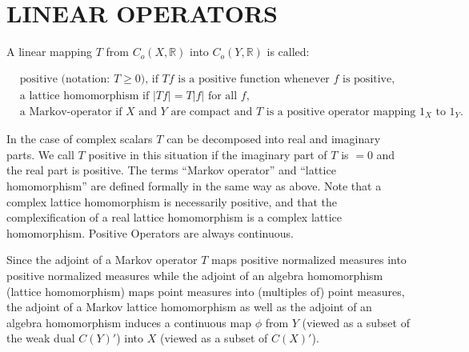 \newpage

\section{LINEAR OPERATORS}
\label{sec:linear-operators}

A linear mapping $T$ from $C_{o}(X,\mathbb{R})$ into $C_{o}(Y,\mathbb{R})$ is called:

\[
\begin{aligned}
	&\text{positive (notation: } T \geq 0 \text{), if } Tf \text{ is a positive function whenever } f \text{ is positive,} \\
	&\text{a lattice homomorphism if } |Tf| = T|f| \text{ for all } f, \\
&\text{a Markov-operator if } X \text{ and } Y \text{ are compact and } T \text{ is a positive operator mapping } 1_{X} \text{ to } 1_{Y}.
\end{aligned}
\]

In the case of complex scalars $T$ can be decomposed into real and imaginary parts.
We call $T$ positive in this situation if the imaginary part of $T$ is $= 0$ and the real part is positive.
The terms \enquote{Markov operator} and \enquote{lattice homomorphism} are defined formally in the same way as above.
Note that a complex lattice homomorphism is necessarily positive, and that the complexification of a real lattice homomorphism is a complex lattice homomorphism.
Positive Operators are always continuous.

Since the adjoint of a Markov operator $T$ maps positive normalized measures into positive normalized measures while the adjoint of an algebra homomorphism (lattice homomorphism) maps point measures into (multiples of) point measures, the adjoint of a Markov lattice homomorphism as well as the adjoint of an algebra homomorphism induces a continuous map $\phi$ from $Y$ (viewed as a subset of the weak dual $C(Y)'$) into $X$ (viewed as a subset of $C(X)'$).

